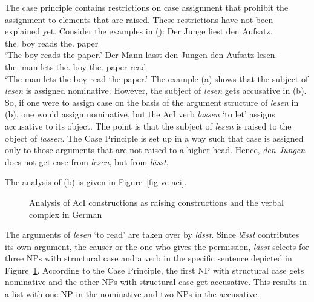 The case principle contains restrictions on case assignment that prohibit the assignment to
elements that are raised. These restrictions have not been explained yet. Consider the examples in ():
\eal
\ex
\gll Der Junge liest den Aufsatz.\\
     the.\NOM{} boy reads the.\ACC{} paper\\
\glt `The boy reads the paper.'
\ex\label{ex-the-man-lets-the-boy-read-the-book}
\gll Der Mann lässt den Jungen den Aufsatz lesen.\\
     the.\NOM{} man lets the.\ACC{} boy the.\ACC{} paper read\\
\glt `The man lets the boy read the paper.'
\zl
The example (a) shows that the subject of \emph{lesen} is
assigned nominative. However, the subject of \emph{lesen} gets accusative in (b). So, if
one were to assign case on the basis of the argument structure of \emph{lesen} in (b), one
would assign nominative, but the AcI verb \emph{lassen} `to let' assigns accusative to its object. The
point is that the subject of \emph{lesen} is raised to the object of \emph{lassen}. The Case
Principle is set up in a way such that case is assigned only to those arguments that are not raised
to a higher head. Hence, \emph{den Jungen} does not get case from \emph{lesen}, but from \emph{lässt}.

The analysis of (b) is given in Figure~\vref{fig-vc-aci}.
\begin{figure}
\caption{\label{fig-vc-aci}Analysis of AcI constructions as raising constructions and the verbal
  complex in German}
\end{figure}
The arguments of \emph{lesen} `to read' are taken over by \emph{lässt}. Since \emph{lässt}
contributes its own argument, the causer or the one who gives the permission, \emph{lässt} selects
for three NPs with structural case and a verb in the specific sentence depicted in
Figure~\ref{fig-vc-aci}. According to the Case Principle, the first NP with structural case gets
nominative and the other NPs with structural case get accusative. This results in a list with one
NP in the nominative and two NPs in the accusative.

